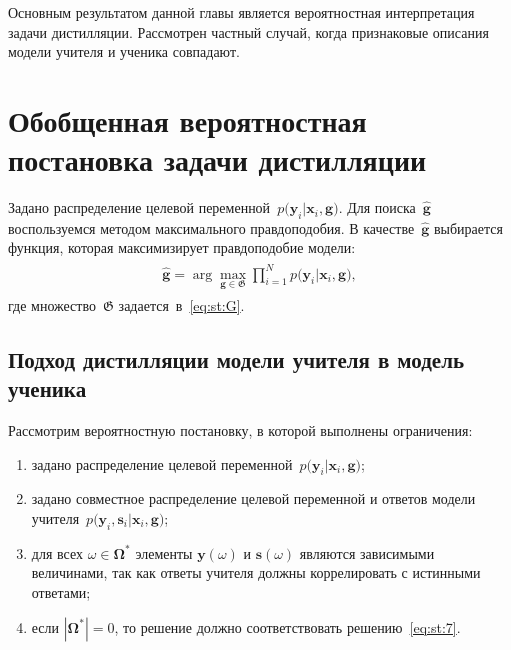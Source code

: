 Основным результатом данной главы является вероятностная интерпретация задачи дистилляции. Рассмотрен частный случай, когда признаковые описания модели учителя и ученика совпадают.

\section{Обобщенная вероятностная постановка задачи дистилляции}
Задано распределение целевой переменной~$p\bigr(\mathbf{y}_i|\mathbf{x}_i, \mathbf{g}\bigr)$.
Для поиска~$\hat{\mathbf{g}}$ воспользуемся методом максимального правдоподобия. В качестве~$\hat{\mathbf{g}}$ выбирается функция, которая максимизирует правдоподобие модели:
\begin{gather}
\label{eq:st:7}
\begin{aligned}
\hat{\mathbf{g}} = \arg\max_{\mathbf{g}\in \mathfrak{G}} \prod_{i=1}^{N}p\bigr(\mathbf{y}_{i}|\mathbf{x}_i, \mathbf{g}\bigr),
\end{aligned}
\end{gather}
где множество~$\mathfrak{G}$ задается~в~\eqref{eq:st:G}.
\subsection{Подход дистилляции модели учителя в модель ученика}
Рассмотрим вероятностную постановку, в которой выполнены ограничения:
\begin{enumerate}[1)]
	\item задано распределение целевой переменной~$p\bigr(\mathbf{y}_i|\mathbf{x}_i, \mathbf{g}\bigr)$;
	\item задано совместное распределение целевой переменной и ответов модели учителя~$p\bigr(\mathbf{y}_i, \mathbf{s}_i|\mathbf{x}_i, \mathbf{g}\bigr)$;
	\item для всех $\omega \in \bm{\Omega}^*$ элементы $\mathbf{y}(\omega)$ и $\mathbf{s}(\omega)$ являются зависимыми величинами, так как ответы учителя должны коррелировать с истинными ответами;
	\item если $|\bm{\Omega}^*|=0$, то решение должно соответствовать решению~\eqref{eq:st:7}.
\end{enumerate}

